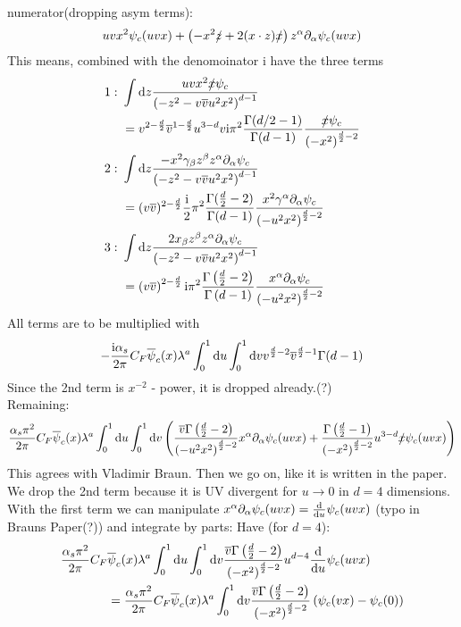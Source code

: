 numerator(dropping asym terms):
\begin{align}
	uvx^2 \psi_c(uvx)+\left( -x^2 \slashed z + 2(x\cdot z) \slashed x \right) z^\alpha\partial_\alpha\psi_c(uvx)
\end{align}
This means, combined with the denomoinator i have the three terms
\begin{align}
	1:~&\int \text{d} z \frac{uvx^2\slashed x\psi_c}{\left(-z^2-v\overline v u^2x^2\right)^{d-1}}
	\\
	&=v^{2-\frac{d}{2}}\overline v ^{1-\frac{d}{2}}u^{3-d}v\text{i} \pi^2 \frac{\Gamma(d/2-1)}{\Gamma(d-1)}\frac{\slashed x \psi_c}{\left(-x^2\right)^{\frac{d}{2}-2}}
	\\
	2:~&\int \text{d} z \frac{-x^2\gamma_\beta z^\beta z^\alpha \partial_\alpha\psi_c}{\left(-z^2-v\overline v u^2x^2\right)^{d-1}}
	\\
	&=
	(v\overline v)^{2-\frac{d}{2}}\frac{\text{i}}{2} \pi^2 \frac{\Gamma(\frac{d}{2}-2)}{\Gamma(d-1)}\frac{x^2\gamma^\alpha\partial_\alpha\psi_c}{\left(-u^2x^2\right)^{\frac{d}{2}-2}}
	\\
	3:~&\int \text{d} z \frac{2x_\beta z^\beta z^\alpha \partial_\alpha\psi_c}{\left(-z^2-v\overline v u^2x^2\right)^{d-1}}
	\\
	&=
	\left( v \overline v \right) ^{2-\frac{d}{2}} \text{i} \pi^2 \frac{\Gamma\left(\frac{d}{2}-2\right)}{\Gamma\left(d-1\right)} \frac{x^\alpha\partial_\alpha\psi_c}{\left(-u^2x^2\right)^{\frac{d}{2}-2}}
\end{align}
All terms are to be multiplied with 
\begin{align}
	-\frac{\text{i} \alpha_s}{2\pi} C_F \overline\psi_c(x) \lambda^a \int _0 ^1 \text{d} u \int_0^1 \text{d} v v^{\frac{d}{2}-2} \overline v ^{\frac{d}{2}-1}\Gamma(d-1)
\end{align}
Since the 2nd term is $x^{-2}$ - power, it is dropped already.(?)\\
Remaining:
\begin{align}
		\frac{\alpha_s\pi^2}{2\pi}C_F \overline\psi_c(x)\lambda^a \int_0^1\text{d} u\int_0^1\text{d} v \left(\frac{\overline v\Gamma\left(\frac{d}{2}-2\right)}{\left(-u^2x^2\right)^{\frac{d}{2}-2}}x^\alpha\partial_\alpha\psi_c(uvx) + \frac{\Gamma\left(\frac{d}{2}-1\right)}{\left(-x^2\right)^{\frac{d}{2}-2}}u^{3-d}\slashed x\psi_c(uvx)\right)
\end{align}
This agrees with Vladimir Braun. Then we go on, like it is written in the paper. We drop the 2nd term because it is UV divergent for $u \rightarrow 0$ in $d=4$ dimensions. With the first term we can manipulate $x^\alpha \partial_\alpha \psi_c(uvx) = \frac{\text{d}}{\text{d} u } \psi_c(uvx) $ (typo in Brauns Paper(?)) and integrate by parts: 
Have (for $d=4$):
\begin{align}
	\frac{\alpha_s\pi^2}{2\pi}C_F &\overline\psi_c(x)\lambda^a \int_0^1\text{d} u\int_0^1\text{d} v\frac{\overline v\Gamma\left(\frac{d}{2}-2\right)}{\left(-x^2\right)^{\frac{d}{2}-2}}u^{d-4}\frac{\text{d}}{\text{d} u }\psi_c(uvx)
	\\
	&=
	\frac{\alpha_s\pi^2}{2\pi}C_F \overline\psi_c(x)\lambda^a \int_0^1\text{d} v\frac{\overline v\Gamma\left(\frac{d}{2}-2\right)}{\left(-x^2\right)^{\frac{d}{2}-2}}\left(\psi_c(vx)-\psi_c(0)\right)
\end{align}
